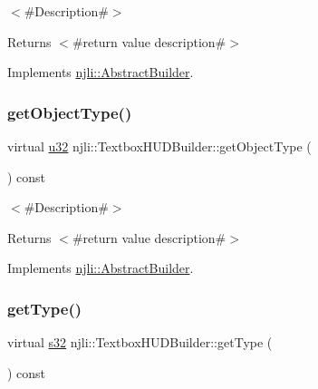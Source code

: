 $<$\#\+Description\#$>$

\begin{DoxyReturn}{Returns}
$<$\#return value description\#$>$ 
\end{DoxyReturn}


Implements \mbox{\hyperlink{classnjli_1_1_abstract_builder_a902f73ea78031b06aca183a417f3413b}{njli\+::\+Abstract\+Builder}}.

\mbox{\label{classnjli_1_1_textbox_h_u_d_builder_a00dc3fc1a82bfd340d01e5602dd9316d}} 
\subsubsection{\texorpdfstring{get\+Object\+Type()}{getObjectType()}}
{\footnotesize\ttfamily virtual \mbox{\hyperlink{_util_8h_a10e94b422ef0c20dcdec20d31a1f5049}{u32}} njli\+::\+Textbox\+H\+U\+D\+Builder\+::get\+Object\+Type (\begin{DoxyParamCaption}{ }\end{DoxyParamCaption}) const\hspace{0.3cm}{\ttfamily [virtual]}}

$<$\#\+Description\#$>$

\begin{DoxyReturn}{Returns}
$<$\#return value description\#$>$ 
\end{DoxyReturn}


Implements \mbox{\hyperlink{classnjli_1_1_abstract_builder_a0f2d344fcf697b167f4f2b1122b5fb33}{njli\+::\+Abstract\+Builder}}.

\mbox{\label{classnjli_1_1_textbox_h_u_d_builder_a1315e4e00afa00b120cc44ac304c51e4}} 
\subsubsection{\texorpdfstring{get\+Type()}{getType()}}
{\footnotesize\ttfamily virtual \mbox{\hyperlink{_util_8h_aa62c75d314a0d1f37f79c4b73b2292e2}{s32}} njli\+::\+Textbox\+H\+U\+D\+Builder\+::get\+Type (\begin{DoxyParamCaption}{ }\end{DoxyParamCaption}) const\hspace{0.3cm}{\ttfamily [virtual]}}

